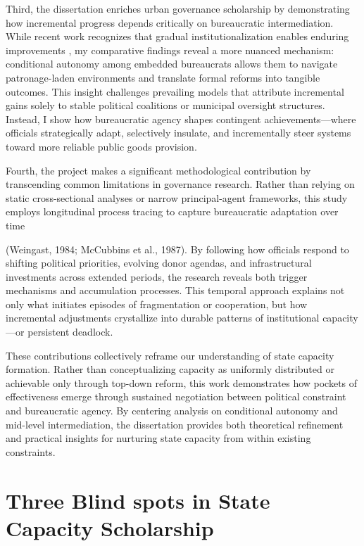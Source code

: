 Third, the dissertation enriches urban governance scholarship by demonstrating how incremental progress depends critically on bureaucratic intermediation. While recent work recognizes that gradual institutionalization enables enduring improvements \citep{eduardo_politics_2021}, my comparative findings reveal a more nuanced mechanism: conditional autonomy among embedded bureaucrats allows them to navigate patronage-laden environments and translate formal reforms into tangible outcomes. This insight challenges prevailing models that attribute incremental gains solely to stable political coalitions or municipal oversight structures. Instead, I show how bureaucratic agency shapes contingent achievements—where officials strategically adapt, selectively insulate, and incrementally steer systems toward more reliable public goods provision.

Fourth, the project makes a significant methodological contribution by transcending common limitations in governance research. Rather than relying on static cross-sectional analyses or narrow principal-agent frameworks, this study employs longitudinal process tracing to capture bureaucratic adaptation over time \cite{cox_electoral_1986}

(Weingast, 1984; McCubbins et al., 1987). By following how officials respond to shifting political priorities, evolving donor agendas, and infrastructural investments across extended periods, the research reveals both trigger mechanisms and accumulation processes. This temporal approach explains not only what initiates episodes of fragmentation or cooperation, but how incremental adjustments crystallize into durable patterns of institutional capacity—or persistent deadlock.

These contributions collectively reframe our understanding of state capacity formation. Rather than conceptualizing capacity as uniformly distributed or achievable only through top-down reform, this work demonstrates how pockets of effectiveness emerge through sustained negotiation between political constraint and bureaucratic agency. By centering analysis on conditional autonomy and mid-level intermediation, the dissertation provides both theoretical refinement and practical insights for nurturing state capacity from within existing constraints.

\section{Three Blind spots in State Capacity Scholarship}


